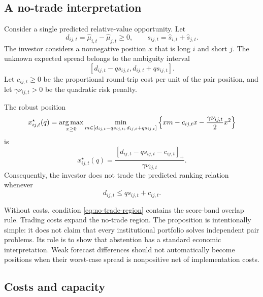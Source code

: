\subsection{A no-trade interpretation}

Consider a single predicted relative-value opportunity. Let
\[
d_{ij,t}
=
\widehat\mu_{i,t}-\widehat\mu_{j,t}
\geq0,
\qquad
s_{ij,t}
=
\widehat s_{i,t}+\widehat s_{j,t}.
\]
The investor considers a nonnegative position $x$ that is long $i$ and short $j$. The unknown expected spread belongs to the ambiguity interval
\[
[d_{ij,t}-q s_{ij,t},
  d_{ij,t}+q s_{ij,t}].
\]
Let $c_{ij,t}\geq0$ be the proportional round-trip cost per unit of the pair position, and let $\gamma\nu_{ij,t}>0$ be the quadratic risk penalty.

\begin{proposition}
\label{prop:no-trade}
The robust position
\begin{equation}
x_{ij,t}^{\star}(q)
=
\operatorname*{arg\,max}_{x\geq0}
\min_{m\in[d_{ij,t}-q s_{ij,t},\,d_{ij,t}+q s_{ij,t}]}
\left\{xm-c_{ij,t}x-\frac{\gamma\nu_{ij,t}}{2}x^2\right\}
\label{eq:robust-pair-choice}
\end{equation}
is
\begin{equation}
x_{ij,t}^{\star}(q)
=
\frac{
[d_{ij,t}-q s_{ij,t}-c_{ij,t}]_+
}{\gamma\nu_{ij,t}}.
\label{eq:no-trade-solution}
\end{equation}
Consequently, the investor does not trade the predicted ranking relation whenever
\begin{equation}
d_{ij,t}
\leq
q s_{ij,t}+c_{ij,t}.
\label{eq:no-trade-region}
\end{equation}
\end{proposition}

Without costs, condition \eqref{eq:no-trade-region} contains the score-band overlap rule. Trading costs expand the no-trade region. The proposition is intentionally simple: it does not claim that every institutional portfolio solves independent pair problems. Its role is to show that abstention has a standard economic interpretation. Weak forecast differences should not automatically become positions when their worst-case spread is nonpositive net of implementation costs.

\subsection{Costs and capacity}

